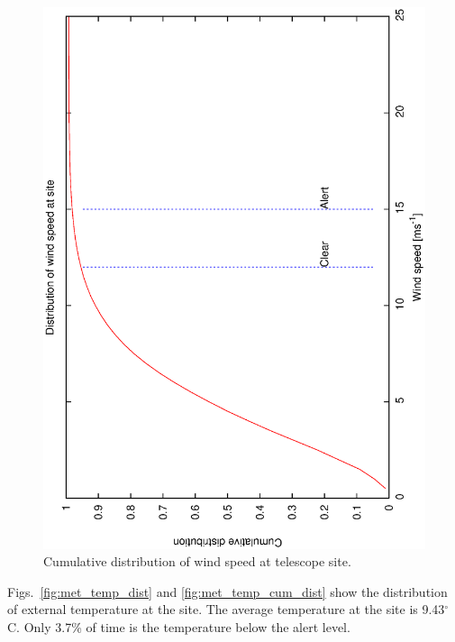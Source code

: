 \begin{figure}[htbp]
\begin{center}
    \includegraphics[scale=0.4, angle=-90]{figures/ecs/ws_25_cum.dat.eps}
\caption[Cumulative distribution of wind speed at telescope site.]
{Cumulative distribution of wind speed at telescope site.}
\end{center} 
 \label{fig:met_windspeed_cum_dist}
\end{figure}

Figs.~\ref{fig:met_temp_dist} and \ref{fig:met_temp_cum_dist} show the distribution of external temperature at the site. The average temperature at the site is 9.43$^{\circ}$C. Only 3.7\% of time is the temperature below the alert level.

